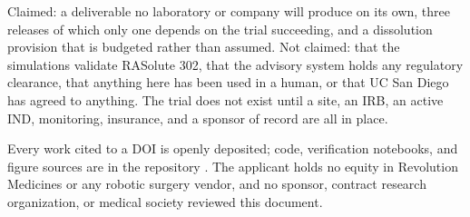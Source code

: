 \vspace{-0.2em}

Claimed: a deliverable no laboratory or company will produce on its own, three
releases of which only one depends on the trial succeeding, and a dissolution
provision that is budgeted rather than assumed. Not claimed: that the simulations validate
RASolute 302, that the advisory system holds any regulatory clearance, that
anything here has been used in a human, or that UC San Diego has agreed to
anything. The trial does not exist until a site, an IRB, an active IND,
monitoring, insurance, and a sponsor of record are all in place.

\vspace{-0.2em}

Every work cited to a DOI is openly deposited; code, verification notebooks, and
figure sources are in the repository \cite{repo2026}. The applicant holds no
equity in Revolution Medicines or any robotic surgery vendor, and no sponsor,
contract research organization, or medical society reviewed this document.

\vspace{0.1em}
\apprule{0.4pt}
\vspace{-0.1em}

\vspace{-0.35em}
\begin{apprefs}


\end{apprefs}
